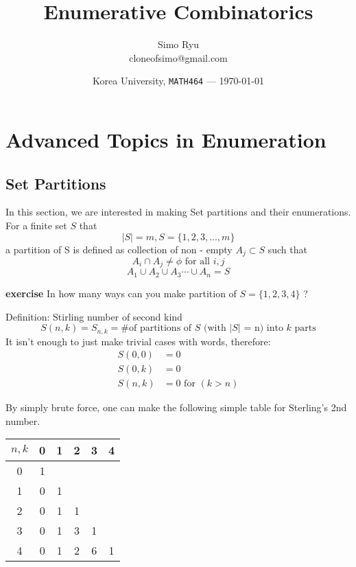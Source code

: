 \documentclass[12pt]{article}
\title{Enumerative Combinatorics}
\author{Simo Ryu \\ cloneofsimo@gmail.com}
\date{Korea University, \texttt{MATH464} --- \today}
\begin{document}
\maketitle

\section{Advanced Topics in Enumeration}

\subsection{Set Partitions}

In this section, we are interested in making Set partitions and their enumerations.
For a finite set $S$ that  $$ |S| = m , S = \{ 1,2,3,...,m\}$$
a partition of S is defined as collection of non - empty $A_j \subset S$
such that \begin{equation}
A_i \cap A_j \neq \phi \text{ for all $i,j$}
\end{equation}
\begin{equation}
  A_1 \cup A_2 \cup A_3 \cdots \cup A_n = S
\end{equation}

\textbf{exercise} In how many ways can you make partition of $S = \{1,2,3,4\}$ ?

Definition: Stirling number of second kind
$$S(n,k) = S_{n,k}  = \text{\# of partitions of $S$ (with $|S|$ = n) into $k$ parts}$$
It isn't enough to just make trivial cases with words, therefore:
\begin{align*}
  S(0,0) &= 0 \\
  S(0,k) &= 0 \\
  S(n,k) &= 0 \text{ for $(k>n)$}
\end{align*}

By simply brute force, one can make the following simple table for Sterling's 2nd number.
\begin{center}
  \begin{tabular}{c|c c c c c}
    $n,k$ & 0 & 1 & 2 & 3 & 4 \\
    \hline
    0 & 1 \\
    1 & 0 & 1 \\
    2 & 0 & 1 & 1 \\
    3 & 0 & 1 & 3 & 1\\
    4 & 0 & 1 & 2 & 6 & 1 \\

  \end{tabular}
\end{center}
\end{document}

